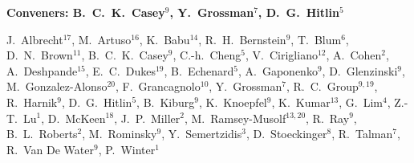 

\begin{center}

\begin{large} {\bf Conveners: B.~C.~K.~Casey$^{9}$, Y.~Grossman$^{7}$, D.~G.~Hitlin$^{5}$} \end{large}

J.~Albrecht$^{17}$, 
M.~Artuso$^{16}$, 
K.~Babu$^{14}$,
R.~H.~Bernstein$^{9}$,
T.~Blum$^{6}$,
D.~N.~Brown$^{11}$, 
B.~C.~K.~Casey$^{9}$,
C.-h.~Cheng$^{5}$,
V.~Cirigliano$^{12}$,
A.~Cohen$^{2}$,
A.~Deshpande$^{15}$,
E.~C.~Dukes$^{19}$, 
B.~Echenard$^{5}$,
A.~Gaponenko$^{9}$,
D.~Glenzinski$^{9}$,
M.~Gonzalez-Alonso$^{20}$, 
F.~Grancagnolo$^{10}$,
Y.~Grossman$^{7}$,
R.~C.~Group$^{9,19}$,
R.~Harnik$^{9}$,
D.~G.~Hitlin$^{5}$, 
B.~Kiburg$^{9}$,
K.~Knoepfel$^{9}$,
K.~Kumar$^{13}$,
G.~Lim$^{4}$,
Z.-T.~Lu$^{1}$,
D.~McKeen$^{18}$,
J.~P.~Miller$^{2}$,
M.~Ramsey-Musolf$^{13,20}$, 
R.~Ray$^{9}$,
B.~L.~Roberts$^{2}$,
M.~Rominsky$^{9}$,
Y.~Semertzidis$^{3}$,
D.~Stoeckinger$^{8}$,
R.~Talman$^{7}$,
R.~Van De Water$^{9}$,
P.~Winter$^{1}$ 


\end{center}




